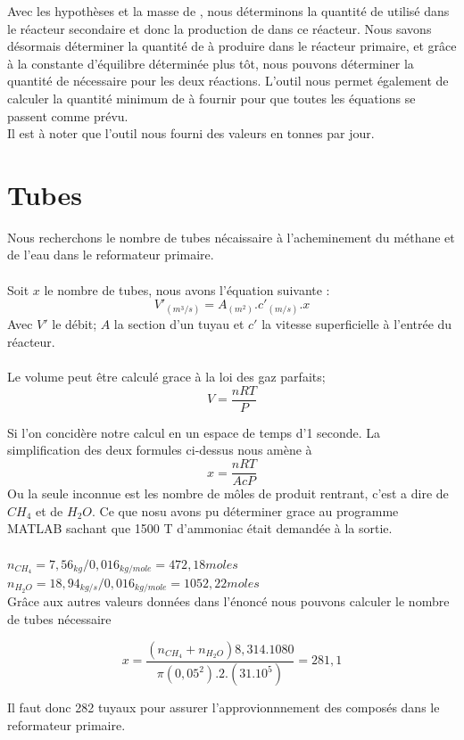 \documentclass[a4paper, oneside, 12pt]{article}
\begin{document}
Avec les hypothèses et la masse de , nous déterminons la quantité de  
utilisé dans le réacteur secondaire et donc la production de  dans ce réacteur. Nous savons désormais 
déterminer la quantité de  à produire dans le réacteur primaire, et grâce à la constante d'équilibre déterminée 
plus tôt, nous pouvons déterminer la quantité de  nécessaire pour les deux réactions. L'outil nous permet également
de calculer la quantité minimum de  à fournir pour que toutes les équations se passent comme prévu. 
\\

Il est à noter que l'outil nous fourni des valeurs en tonnes par jour.

\section{Tubes}
Nous recherchons le nombre de tubes nécaissaire à l'acheminement du méthane et de l'eau dans le reformateur primaire.\\
\\
Soit $x$ le nombre de tubes, nous avons l'équation suivante :
\[
V'_{(m^3/s)} = A_{(m^2)}. c'_{(m/s)} .x
\]
Avec $V'$ le débit; $A$ la section d'un tuyau et $c'$ la vitesse superficielle à l'entrée du réacteur.\\
\\
Le volume peut être calculé grace à la loi des gaz parfaits;
\[
V=\frac{nRT}{P}
\]

Si l'on concidère notre calcul en un espace de temps d'1 seconde. La simplification des deux formules ci-dessus nous amène à
\[
x=\frac{nRT}{AcP}
\]
Ou la seule inconnue est les nombre de môles de produit rentrant, c'est a dire de $CH_{4}$ et de $H_{2}O$. Ce que nosu avons pu déterminer grace au programme MATLAB sachant que 1500 T d'ammoniac était demandée à la sortie.\\
\\
$n_{CH_{4}}= 7,56_{kg} / 0,016_{kg/mole} = 472,18 moles$\\
$n_{H_{2}O}= 18,94_{kg/s}/ 0,016_{kg/mole} = 1052,22 moles$\\

Grâce aux autres valeurs données dans l'énoncé nous pouvons calculer le nombre de tubes nécessaire 


\[
x=\frac{(n_{CH_{4}}+n_{H_{2}O})8,314.1080}{\pi(0,05^2).2.(31.10^5)}=281,1
\]

Il faut donc 282 tuyaux pour assurer l'approvionnnement des composés dans le reformateur primaire.
\end{document}
